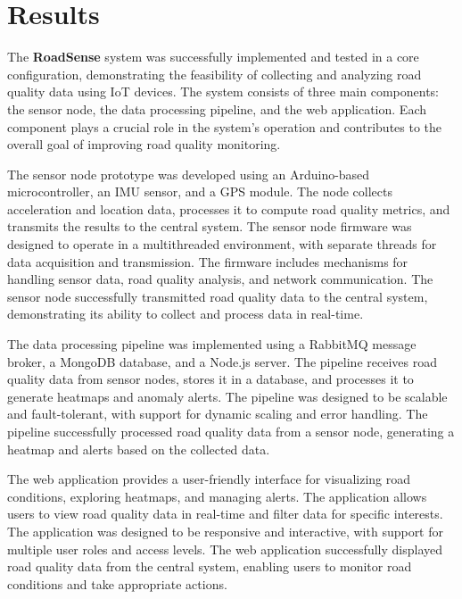 \section{Results}

The \textbf{RoadSense} system was successfully implemented and tested in a core configuration, demonstrating the feasibility of collecting and analyzing road quality data using IoT devices. The system consists of three main components: the sensor node, the data processing pipeline, and the web application. Each component plays a crucial role in the system's operation and contributes to the overall goal of improving road quality monitoring.

The sensor node prototype was developed using an Arduino-based microcontroller, an IMU sensor, and a GPS module. The node collects acceleration and location data, processes it to compute road quality metrics, and transmits the results to the central system. The sensor node firmware was designed to operate in a multithreaded environment, with separate threads for data acquisition and transmission. The firmware includes mechanisms for handling sensor data, road quality analysis, and network communication. The sensor node successfully transmitted road quality data to the central system, demonstrating its ability to collect and process data in real-time.

The data processing pipeline was implemented using a RabbitMQ message broker, a MongoDB database, and a Node.js server. The pipeline receives road quality data from sensor nodes, stores it in a database, and processes it to generate heatmaps and anomaly alerts. The pipeline was designed to be scalable and fault-tolerant, with support for dynamic scaling and error handling. The pipeline successfully processed road quality data from a sensor node, generating a heatmap and alerts based on the collected data.

The web application provides a user-friendly interface for visualizing road conditions, exploring heatmaps, and managing alerts. The application allows users to view road quality data in real-time and filter data for specific interests. The application was designed to be responsive and interactive, with support for multiple user roles and access levels. The web application successfully displayed road quality data from the central system, enabling users to monitor road conditions and take appropriate actions.